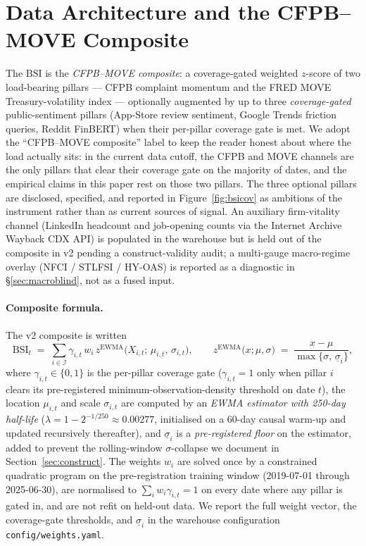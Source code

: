 \documentclass[11pt,letterpaper]{article}
\newcommand{\bsi}{\text{BSI}}
\newcommand{\z}{z}
\begin{document}
\section{Data Architecture and the CFPB--MOVE Composite}
\label{sec:data}

The $\bsi$ is the \emph{CFPB--MOVE composite}: a coverage-gated
weighted $z$-score of two load-bearing pillars --- CFPB complaint
momentum and the FRED MOVE Treasury-volatility index --- optionally
augmented by up to three \emph{coverage-gated} public-sentiment
pillars (App-Store review sentiment, Google Trends friction queries,
Reddit FinBERT) when their per-pillar coverage gate is met. We adopt
the ``CFPB--MOVE composite'' label to keep the reader honest about
where the load actually sits: in the current data cutoff, the CFPB
and MOVE channels are the only pillars that clear their coverage gate
on the majority of dates, and the empirical claims in this paper rest
on those two pillars. The three optional pillars are disclosed,
specified, and reported in Figure~\ref{fig:bsicov} as ambitions of the
instrument rather than as current sources of signal. An auxiliary
firm-vitality channel (LinkedIn headcount and job-opening counts via
the Internet Archive Wayback CDX API) is populated in the warehouse
but is held out of the composite in v2 pending a construct-validity
audit; a multi-gauge macro-regime overlay (NFCI / STLFSI / HY-OAS) is
reported as a diagnostic in \S\ref{sec:macroblind}, not as a fused
input.

\paragraph{Composite formula.}
The v2 composite is written
%
\begin{equation}
\bsi_t
\;=\;
\sum_{i \in \mathcal{I}}
    \gamma_{i,t} \, w_i \,
    \z^{\mathrm{EWMA}}\!\bigl(X_{i,t};\, \mu_{i,t},\, \sigma_{i,t}\bigr),
\qquad
\z^{\mathrm{EWMA}}\bigl(x;\mu,\sigma\bigr)
\;=\;
\frac{x - \mu}{\max\{\sigma,\,\underline{\sigma}_i\}},
\label{eq:bsi}
\end{equation}
%
where $\gamma_{i,t} \in \{0,1\}$ is the per-pillar coverage gate
(\mbox{$\gamma_{i,t}=1$} only when pillar $i$ clears its pre-registered
minimum-observation-density threshold on date $t$), the location
$\mu_{i,t}$ and scale $\sigma_{i,t}$ are computed by an \emph{EWMA
estimator with 250-day half-life}
(\mbox{$\lambda = 1-2^{-1/250}\approx 0.00277$},
initialised on a 60-day causal warm-up and updated recursively
thereafter), and $\underline{\sigma}_i$ is a
\emph{pre-registered floor} on the estimator, added to prevent the
rolling-window $\sigma$-collapse we document in
Section~\ref{sec:construct}. The weights $w_i$ are solved once by a
constrained quadratic program on the pre-registration training window
(\mbox{2019-07-01} through \mbox{2025-06-30}), are normalised to
$\sum_i w_i \gamma_{i,t} = 1$ on every date where any pillar is gated
in, and are not refit on held-out data. We report the full weight
vector, the coverage-gate thresholds, and $\underline{\sigma}_i$ in
the warehouse configuration \texttt{config/weights.yaml}.
\end{document}

